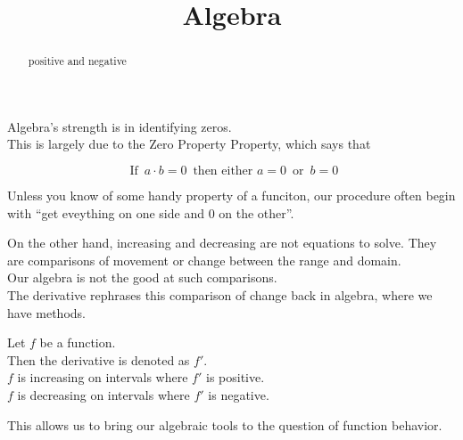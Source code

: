 \documentclass{ximera}
\title{Algebra}
\begin{document}
\begin{abstract}
positive and negative
\end{abstract}
\maketitle



Algebra's strength is in identifying zeros. \\


This is largely due to the Zero Property Property, which says that 



\[
\text{ If } \, a \cdot b = 0 \, \text{ then either } a = 0 \, \text{ or } \, b = 0
\]


Unless you know of some handy property of a funciton, our procedure often begin with ``get eveything on one side and $0$ on the other''.




On the other hand, increasing and decreasing are not equations to solve.  They are comparisons of movement or change between the range and domain. \\

Our algebra is not the good at such comparisons. \\


The derivative rephrases this comparison of change back in algebra, where we have methods. \\





\begin{template}

Let $f$ be a function. \\

Then the derivative is denoted as $f'$. \\


$f$ is increasing on intervals where $f'$ is positive. \\


$f$ is decreasing on intervals where $f'$ is negative. \\


\end{template}

This allows us to bring our algebraic tools to the question of function behavior. \\
\end{document}
